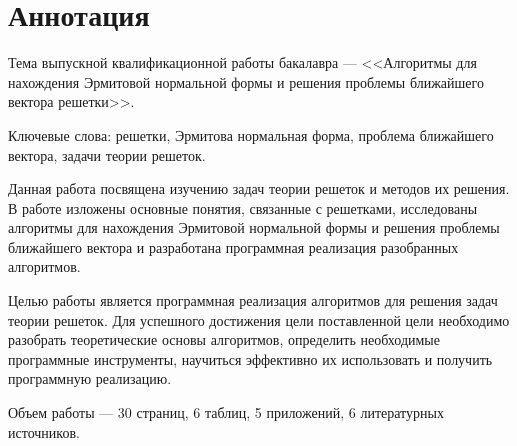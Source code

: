 \newpage
\setcounter{page}{2}

\section*{Аннотация}

Тема выпускной квалификационной работы бакалавра --- <<Алгоритмы для нахождения Эрмитовой нормальной формы и решения проблемы ближайшего вектора решетки>>.

Ключевые слова: решетки, Эрмитова нормальная форма, проблема ближайшего вектора, задачи теории решеток.

Данная работа посвящена изучению задач теории решеток и методов их решения. В работе изложены основные понятия, связанные с решетками, исследованы алгоритмы для нахождения Эрмитовой нормальной формы и решения проблемы ближайшего вектора и разработана программная реализация разобранных алгоритмов.

Целью работы является программная реализация алгоритмов для решения задач теории решеток. Для успешного достижения цели поставленной цели необходимо разобрать теоретические основы алгоритмов, определить необходимые программные инструменты,  научиться эффективно их использовать и получить программную реализацию.

Объем работы --- 30 страниц, 6 таблиц, 5 приложений, 6 литературных источников.

\clearpage